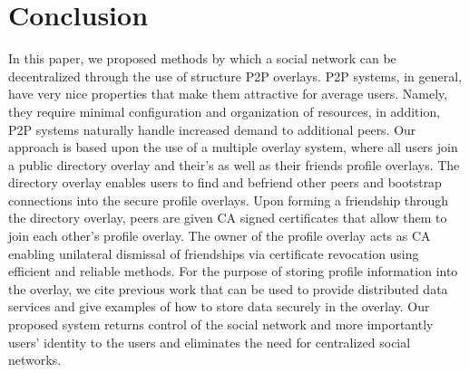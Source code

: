 \documentclass[conference]{IEEEtran}
\begin{document}
\section{Conclusion}
\label{conclusion}

In this paper, we proposed methods by which a social network can be
decentralized through the use of structure P2P overlays.  P2P systems, in
general, have very nice properties that make them attractive for average
users.  Namely, they require minimal configuration and organization of
resources, in addition, P2P systems naturally handle increased demand to
additional peers.  Our approach is based upon the use of a multiple overlay
system, where all users join a public directory overlay and their's as well as
their friends profile overlays.  The directory overlay enables users to find
and befriend other peers and bootstrap connections into the secure profile
overlays.  Upon forming a friendship through the directory overlay, peers are
given CA signed certificates that allow them to join each other's profile
overlay.  The owner of the profile overlay acts as CA enabling unilateral
dismissal of friendships via certificate revocation using efficient and
reliable methods.  For the purpose of storing profile information into the
overlay, we cite previous work that can be used to provide distributed data
services and give examples of how to store data securely in the overlay.  Our
proposed system returns control of the social network and more importantly
users' identity to the users and eliminates the need for centralized social
networks.

\small{


}
\end{document}

